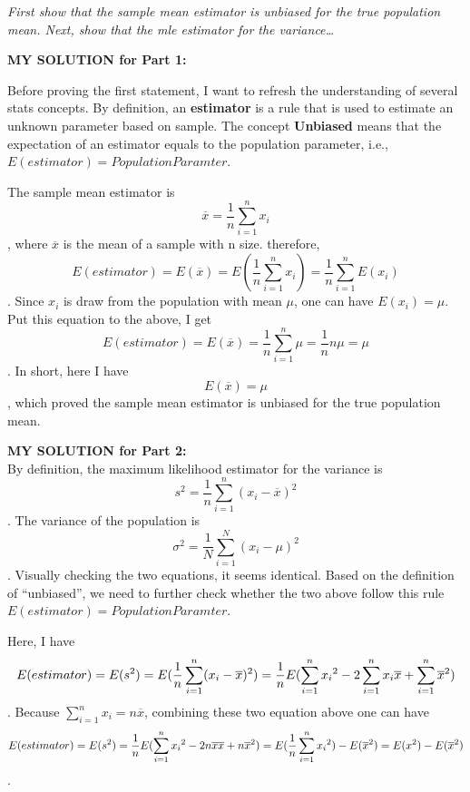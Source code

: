 \documentclass[
]{article}
\begin{document}
\emph{First show that the sample mean estimator is unbiased for the true
population mean. Next, show that the mle estimator for the
variance\ldots{}}

\textbf{MY SOLUTION for Part 1:}

Before proving the first statement, I want to refresh the understanding
of several stats concepts. By definition, an \textbf{estimator} is a
rule that is used to estimate an unknown parameter based on sample. The
concept \textbf{Unbiased} means that the expectation of an estimator
equals to the population parameter, i.e.,
\(E(estimator) = Population Paramter\).

The sample mean estimator is
\[\overline{x} = \frac{1}{n}\sum_{i = 1}^{n} x_{i}\], where
\(\overline{x}\) is the mean of a sample with n size. therefore,
\[E(estimator) = E(\overline{x})=E(\frac{1}{n}\sum_{i = 1}^{n} x_{i})= \frac{1}{n}\sum_{i = 1}^{n}E(x_i)\].
Since \(x_i\) is draw from the population with mean \(\mu\), one can
have \(E(x_i) = \mu\). Put this equation to the above, I get
\[E(estimator) = E(\overline{x}) = \frac{1}{n}\sum_{i = 1}^{n}\mu=\frac{1}{n}n\mu=\mu\].
In short, here I have \[E(\overline{x})= \mu\], which proved the sample
mean estimator is unbiased for the true population mean.

\textbf{MY SOLUTION for Part 2:}\\
By definition, the maximum likelihood estimator for the variance is
\[s^2=\frac{1}{n}\sum_{i = 1}^{n}(x_i-\overline{x})^2\]. The variance of
the population is \[\sigma^2=\frac{1}{N}\sum_{i = 1}^{N}(x_i-{\mu})^2\].
Visually checking the two equations, it seems identical. Based on the
definition of ``unbiased'', we need to further check whether the two
above follow this rule \(E(estimator) = Population Paramter\).

Here, I have
\[E(estimator) = E(s^2)=E(\frac{1}{n}\sum_{i = 1}^{n}(x_i-\overline{x})^2)=\\\frac{1}{n}E(\sum_{i = 1}^{n}{x_i}^2 - 2\sum_{i = 1}^{n}x_i\overline{x}+\sum_{i = 1}^{n}\overline{x}^2)\].
Because \(\sum_{i = 1}^{n}x_i = n\overline{x}\), combining these two
equation above one can have
\[E(estimator)=E(s^2)=\frac{1}{n}E(\sum_{i = 1}^{n}{x_i}^2 - 2n\overline{x}\overline{x}+n\overline{x}^2)=\\E(\frac{1}{n}\sum_{i = 1}^{n}{x_i}^2)-E(\overline{x}^2)=\\E(x^2)-E(\overline{x}^2)\].
\end{document}

